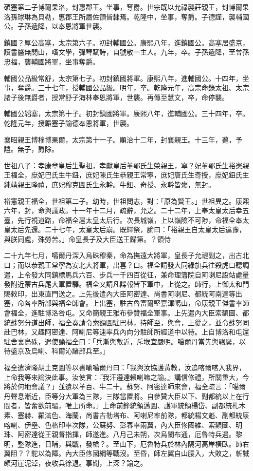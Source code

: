 \begin{pinyinscope}
碩塞第二子博爾果洛，封惠郡王。坐事，奪爵。世宗既以允祿襲莊親王，封博爾果洛孫球琳為貝勒，惠郡王所屬佐領皆隸焉。乾隆中，坐事，奪爵。子德謹，襲輔國公。子孫遞降，以奉恩將軍世襲。

鎮國？厚公高塞，太宗第六子。初封輔國公。康熙八年，進鎮國公。高塞居盛京，讀書醫無閭山，嗜文學，彈琴賦詩，自號敬一主人。九年，卒。子孫遞降，至曾孫忠福，襲輔國將軍，坐事奪爵。

輔國公品級常舒，太宗第七子。初封鎮國將軍。康熙八年，進輔國公。十四年，坐事，奪爵。三十七年，授輔國公品級。明年，卒。乾隆元年，高宗命錄太祖、太宗諸子後無爵者，授常舒子海林奉恩將軍，世襲。再傳至慧文，卒，命停襲。

輔國公韜塞，太宗第十子。初封鎮國將軍。康熙八年，進輔國公。三十四年，卒。乾隆元年，授韜塞子諭德奉恩將軍，世襲。

襄昭親王博穆博果爾，太宗第十一子。順治十二年，封襄親王。十三年，薨，予謚。無子，爵除。

世祖八子：孝康章皇后生聖祖，孝獻皇后董鄂氏生榮親王，寧？妃董鄂氏生裕憲親王福全，庶妃巴氏生牛鈕，庶妃陳氏生恭親王常寧，庶妃唐氏生奇授，庶妃鈕氏生純靖親王隆禧，庶妃穆克圖氏生永幹。牛鈕、奇授、永幹皆殤，無封。

裕憲親王福全，世祖第二子。幼時，世祖問志，對：「原為賢王。」世祖異之。康熙六年，封，命與議政。十一年十二月，疏辭，允之。二十二年，上奉太皇太后幸五臺，先行視道路，命福全扈太皇太后行。次長城嶺，上以嶺險不可陟，命福全奉太皇太后先還。二十七年，太皇太后崩。既繹祭，諭曰：「裕親王自太皇太后違豫，與朕同處，殊勞苦。」命皇長子及大臣送王歸第。？領侍

二十九年七月，噶爾丹深入烏硃穆秦，命為撫遠大將軍，皇長子允禔副之，出古北口；而以恭親王常寧為安北大將軍，出喜？口。福全請發大同綠旗兵往殺虎口聽調遣，上令發大同鎮標馬兵六百、步兵一千四百從征，兼命理籓院自阿喇尼設站處量發附近蒙古兵尾大軍置驛。福全又請凡諜報皆下軍中，上從之。師行，上御太和門賜敕印，出東直門送之。上先後遣內大臣阿密達、尚書阿喇尼、都統阿南達等出塞，命各率所部與福全師會。上出塞，駐古魯富爾堅嘉渾噶山，命康親王傑書率師會福全，進駐博洛咎屯。又命簡親王雅布參贊福全軍事。上先遣內大臣索額圖、都統蘇努分道出師，福全奏請令索額圖駐巴林，待師至，與會，上從之，並令蘇努同赴巴林，又趣阿密達、阿喇尼等速率兵內向分駐師所經道中以待。上自博洛和屯還駐舍裏烏硃，遣使諭福全曰：「兵漸與敵近，斥堠宜嚴明。噶爾丹當先與羈縻，以待盛京及烏喇、科爾沁諸部兵至。」

福全遣濟隆胡土克圖等以書喻噶爾丹曰：「我與汝協護黃教，汝追喀爾喀入我界，上命我等來論決此事。汝使言：『我汗遵達賴喇嘛之諭。』講信修禮，所關重大，今將於何地會議？」並遺以羊百、牛二十。蘇努、阿密達師來會，福全疏言：「噶爾丹聲息漸近，臣等分大軍為三隊，三隊當置將。自參贊大臣以下、副都統以上在行間者，皆奮欲前驅，唯上所命。」上命前鋒統領邁圖、護軍統領楊岱、副都統札木素、塞赫、羅滿色、海蘭，尚書吉勒塔布、阿喇尼率前隊，都統楊文魁、副都統康喀喇、伊壘、色格印率次隊，公蘇努、彭春率兩翼，內大臣佟國維、索額圖、明珠、阿密達從王親督指揮，師遂進。八月己未朔，次烏闌布通，厄魯特兵遇。黎明，整隊進，日晡，與戰，發槍？。至山下，厄魯特兵於林內隔河高岸橫臥。師右翼阻？？駝以為障。內大臣佟國綱等戰沒。至昏，師左翼自山腰入，大敗之，斬馘頗河崖泥淖，夜收兵徐退。事聞，上深？諭之。


\end{pinyinscope}

